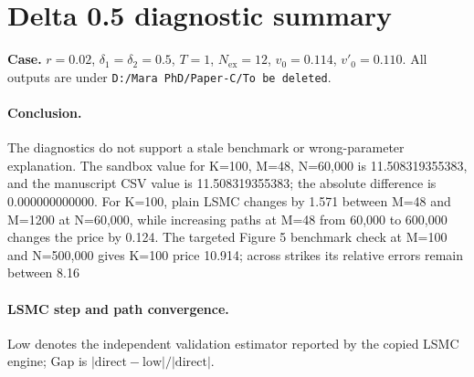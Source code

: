 \documentclass{article}
\begin{document}
\section*{Delta 0.5 diagnostic summary}
\textbf{Case.} $r=0.02$, $\delta_1=\delta_2=0.5$, $T=1$, $N_{\mathrm{ex}}=12$, $v_0=0.114$, $v'_0=0.110$. All outputs are under \texttt{D:/Mara PhD/Paper-C/To be deleted}.

\paragraph{Conclusion.}
The diagnostics do not support a stale benchmark or wrong-parameter explanation. The sandbox value for K=100, M=48, N=60,000 is 11.508319355383, and the manuscript CSV value is 11.508319355383; the absolute difference is 0.000000000000. For K=100, plain LSMC changes by 1.571 between M=48 and M=1200 at N=60,000, while increasing paths at M=48 from 60,000 to 600,000 changes the price by 0.124.  The targeted Figure 5 benchmark check at M=100 and N=500,000 gives K=100 price 10.914; across strikes its relative errors remain between 8.16%

\paragraph{LSMC step and path convergence.}
Low denotes the independent validation estimator reported by the copied LSMC engine; Gap is $|\mathrm{direct}-\mathrm{low}|/|\mathrm{direct}|$.
\end{document}
